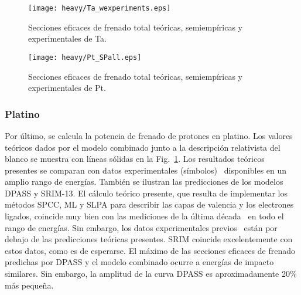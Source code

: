 \begin{figure}%
\centering
\vspace{-0.7cm}
\texttt{[image: heavy/Ta\_wexperiments.eps]}
\caption[Secciones eficaces teóricas, semiempíricas y experimentales de 
Ta.]
{Secciones eficaces de frenado total teóricas, semiempíricas y
experimentales de Ta.}
\label{fig:Ta_SP}

\vspace{0.3cm}
\texttt{[image: heavy/Pt\_SPall.eps]}
\caption[Secciones eficaces teóricas, semiempíricas y experimentales de 
Pt.]
{Secciones eficaces de frenado total teóricas, semiempíricas y
experimentales de Pt.}
\label{fig:Pt_SP}
\end{figure}

\subsubsection{Platino}

Por último, se calcula la potencia de frenado de protones en platino. 
Los valores teóricos dados por el modelo combinado junto a la 
descripción relativista del blanco se muestra con líneas sólidas en la 
Fig.~\ref{fig:Pt_SP}. Los resultados teóricos presentes se comparan con 
datos experimentales (símbolos)~\cite{iaea,Primetzhofer:12,Goebl:13,
Celedon:15,Moro:20} disponibles en un amplio rango de energías. También 
se ilustran las predicciones de los modelos DPASS y SRIM-13. 
El cálculo teórico presente, que resulta de implementar los métodos 
SPCC, ML y SLPA para describir las capas de valencia y los electrones 
ligados, coincide muy bien con las mediciones de la última 
década~\cite{Primetzhofer:12,Goebl:13,Celedon:15,Moro:20} en todo el 
rango de energías. Sin embargo, los datos experimentales 
previos~\cite{iaea,Krist:83,Sirotinin:84,Ishiwari:74,Ishiwari:79,
Ogino:88,Sakamoto:91,Shiomi:94} están por 
debajo de las predicciones teóricas presentes. SRIM coincide 
excelentemente con estos datos, como es de esperarse. El máximo de las 
secciones eficaces de frenado predichas por DPASS y el modelo combinado 
ocurre a energías de impacto similares. Sin embargo, la amplitud de la 
curva DPASS es aproximadamente 20\% más pequeña. 

\begin{comment}
\subsection{Ionización de capa $L$}
\label{subsec:results-ionLshell}

En esta sección se examina la ionización de capa $L$ a partir de la 
aproximación de plasma local por capa en dos blancos relativistas: Ta y 
Pt. 
\end{comment}

